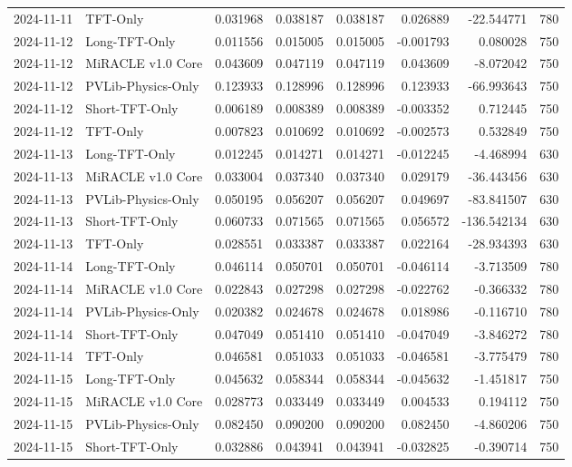 \begin{tabular}{llrrrrrr}
2024-11-11 & TFT-Only & 0.031968 & 0.038187 & 0.038187 & 0.026889 & -22.544771 & 780 \\
2024-11-12 & Long-TFT-Only & 0.011556 & 0.015005 & 0.015005 & -0.001793 & 0.080028 & 750 \\
2024-11-12 & MiRACLE v1.0 Core & 0.043609 & 0.047119 & 0.047119 & 0.043609 & -8.072042 & 750 \\
2024-11-12 & PVLib-Physics-Only & 0.123933 & 0.128996 & 0.128996 & 0.123933 & -66.993643 & 750 \\
2024-11-12 & Short-TFT-Only & 0.006189 & 0.008389 & 0.008389 & -0.003352 & 0.712445 & 750 \\
2024-11-12 & TFT-Only & 0.007823 & 0.010692 & 0.010692 & -0.002573 & 0.532849 & 750 \\
2024-11-13 & Long-TFT-Only & 0.012245 & 0.014271 & 0.014271 & -0.012245 & -4.468994 & 630 \\
2024-11-13 & MiRACLE v1.0 Core & 0.033004 & 0.037340 & 0.037340 & 0.029179 & -36.443456 & 630 \\
2024-11-13 & PVLib-Physics-Only & 0.050195 & 0.056207 & 0.056207 & 0.049697 & -83.841507 & 630 \\
2024-11-13 & Short-TFT-Only & 0.060733 & 0.071565 & 0.071565 & 0.056572 & -136.542134 & 630 \\
2024-11-13 & TFT-Only & 0.028551 & 0.033387 & 0.033387 & 0.022164 & -28.934393 & 630 \\
2024-11-14 & Long-TFT-Only & 0.046114 & 0.050701 & 0.050701 & -0.046114 & -3.713509 & 780 \\
2024-11-14 & MiRACLE v1.0 Core & 0.022843 & 0.027298 & 0.027298 & -0.022762 & -0.366332 & 780 \\
2024-11-14 & PVLib-Physics-Only & 0.020382 & 0.024678 & 0.024678 & 0.018986 & -0.116710 & 780 \\
2024-11-14 & Short-TFT-Only & 0.047049 & 0.051410 & 0.051410 & -0.047049 & -3.846272 & 780 \\
2024-11-14 & TFT-Only & 0.046581 & 0.051033 & 0.051033 & -0.046581 & -3.775479 & 780 \\
2024-11-15 & Long-TFT-Only & 0.045632 & 0.058344 & 0.058344 & -0.045632 & -1.451817 & 750 \\
2024-11-15 & MiRACLE v1.0 Core & 0.028773 & 0.033449 & 0.033449 & 0.004533 & 0.194112 & 750 \\
2024-11-15 & PVLib-Physics-Only & 0.082450 & 0.090200 & 0.090200 & 0.082450 & -4.860206 & 750 \\
2024-11-15 & Short-TFT-Only & 0.032886 & 0.043941 & 0.043941 & -0.032825 & -0.390714 & 750 \\

\end{tabular}
